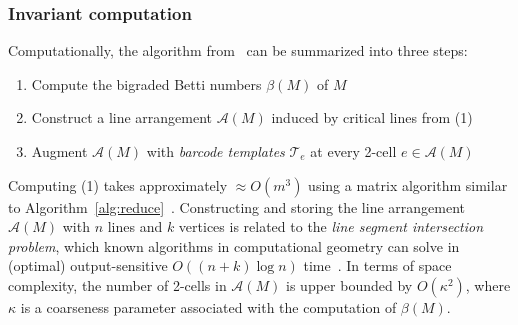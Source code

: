 \documentclass[sn-mathphys]{sn-jnl}
\begin{document}
\subsubsection{Invariant computation}
Computationally, the algorithm from~\cite{lesnick2019computing} can be summarized into three steps: 
\begin{enumerate}
	\item Compute the bigraded Betti numbers $\beta(M)$ of $M$
	\item Construct a line arrangement $\mathcal{A}(M)$ induced by critical lines from (1) 
	\item Augment $\mathcal{A}(M)$ with \emph{barcode templates} $\mathcal{T}_e$ at every 2-cell $e \in \mathcal{A}(M)$
\end{enumerate}
Computing (1) takes approximately $\approx O(m^3)$ using a matrix algorithm similar to Algorithm~\ref{alg:reduce}~\cite{lesnick2019computing}. Constructing and storing the line arrangement $\mathcal{A}(M)$ with $n$ lines and $k$ vertices is related to the \emph{line segment intersection problem}, which known algorithms in computational geometry can solve in (optimal) output-sensitive $O((n+k) \log n)$ time~\cite{boissonnat2000robust}. 
In terms of space complexity, the number of 2-cells in $\mathcal{A}(M)$ is upper bounded by $O(\kappa^2)$, where $\kappa$ is a coarseness parameter associated with the computation of $\beta(M)$. 
\end{document}

